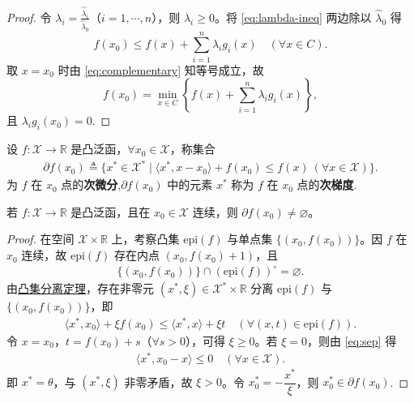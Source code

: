 \documentclass[../../main.tex]{subfiles}%
\begin{document}
\begin{proof}
令 $\lambda_i = \frac{\wideparen{\lambda}_i}{\wideparen{\lambda}_0}$（$i=1,\cdots,n$），则 $\lambda_i \geqslant 0$。将 \eqref{eq:lambda-ineq} 两边除以 $\wideparen{\lambda}_0$ 得
\[
f(x_0) \leqslant f(x) + \sum_{i=1}^n \lambda_i g_i(x) \quad (\forall x \in C).
\]
取 $x = x_0$ 时由 \eqref{eq:complementary} 知等号成立，故
\[
f(x_0) = \min_{x \in C} \left\{ f(x) + \sum_{i=1}^n \lambda_i g_i(x) \right\},
\]
且 $\lambda_i g_i(x_0)=0$.
\end{proof}

\begin{definition}
设 $f: \mathscr{X} \to \mathbb{R}$ 是凸泛函，$\forall x_0 \in \mathscr{X}$，称集合
\begin{align*}
\partial f(x_0) \triangleq \{ x^* \in \mathscr{X}^* \mid \langle x^*, x - x_0 \rangle + f(x_0) \leqslant f(x) \ (\forall x \in \mathscr{X}) \}.
\end{align*}
为 $f$ 在 $x_0$ 点的\textbf{次微分},$\partial f(x_0)$ 中的元素 $x^*$ 称为 $f$ 在 $x_0$ 点的\textbf{次梯度}.
\end{definition}

\begin{theorem}
若 $f: \mathscr{X} \to \mathbb{R}$ 是凸泛函，且在 $x_0 \in \mathscr{X}$ 连续，则 $\partial f(x_0) \neq \varnothing$。
\end{theorem}
\begin{proof}
在空间 $\mathscr{X} \times \mathbb{R}$ 上，考察凸集 $\mathrm{epi}(f)$ 与单点集 $\{(x_0, f(x_0))\}$。因 $f$ 在 $x_0$ 连续，故 $\mathrm{epi}(f)$ 存在内点 $(x_0, f(x_0)+1)$，且
\begin{align*}
\{(x_0, f(x_0))\} \cap (\mathrm{epi}(f))^\circ = \varnothing.
\end{align*}
由\hyperref[theorem:泛函分析--凸集分离定理]{凸集分离定理}，存在非零元 $(x^*, \xi) \in \mathscr{X}^* \times \mathbb{R}$ 分离 $\mathrm{epi}(f)$ 与 $\{(x_0, f(x_0))\}$，即
\begin{align}
\langle x^*, x_0 \rangle + \xi f(x_0) \leqslant \langle x^*, x \rangle + \xi t \quad (\forall (x,t) \in \mathrm{epi}(f)).
\label{eq:sep}
\end{align}
令 $x = x_0$，$t = f(x_0) + s$（$\forall s > 0$），可得 $\xi \geqslant 0$。若 $\xi = 0$，则由 \eqref{eq:sep} 得
\begin{align*}
\langle x^*, x_0 - x \rangle \leqslant 0 \quad (\forall x \in \mathscr{X}).
\end{align*}
即 $x^* = \theta$，与 $(x^*, \xi)$ 非零矛盾，故 $\xi > 0$。令 $x_0^* = -\dfrac{x^*}{\xi}$，则 $x_0^* \in \partial f(x_0)$.
\end{proof}
\end{document}
